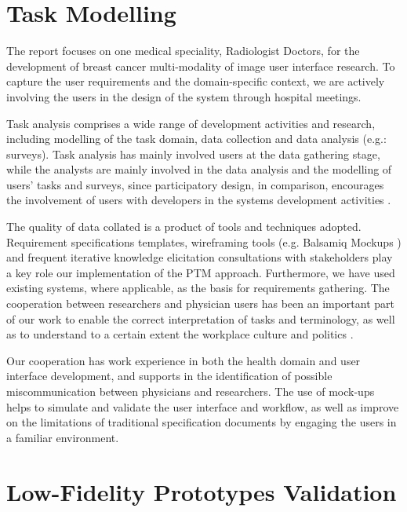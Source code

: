 \clearpage

\section{Task Modelling}

The report focuses on one medical speciality, Radiologist Doctors, for the development of breast cancer multi-modality of image user interface research. To capture the user requirements and the domain-specific context, we are actively involving the users in the design of the system through hospital meetings.

Task analysis comprises a wide range of development activities and research, including modelling of the task domain, data collection and data analysis (e.g.: surveys). Task analysis has mainly involved users at the data gathering stage, while the analysts are mainly involved in the data analysis and the modelling of users’ tasks and surveys, since participatory design, in comparison, encourages the involvement of users with developers in the systems development activities \cite{muller1993taxonomy}.

The quality of data collated is a product of tools and techniques adopted. Requirement specifications templates, wireframing tools (e.g. Balsamiq Mockups \cite{balsamiqMockups}) and frequent iterative knowledge elicitation consultations with stakeholders play a key role our implementation of the PTM approach. Furthermore, we have used existing systems, where applicable, as the basis for requirements gathering. The cooperation between researchers and physician users has been an important part of our work to enable the correct interpretation of tasks and terminology, as well as to understand to a certain extent the workplace culture and politics \cite{williams1993translation}.

Our cooperation has work experience in both the health domain and user interface development, and supports in the identification of possible miscommunication between physicians and researchers. The use of mock-ups helps to simulate and validate the user interface and workflow, as well as improve on the limitations of traditional specification documents by engaging the users in a familiar environment.

\clearpage

\section{Low-Fidelity Prototypes Validation}

